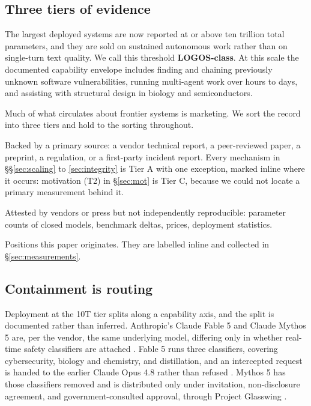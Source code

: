 \documentclass[11pt]{article}
\begin{document}
\subsection{Three tiers of evidence}

The largest deployed systems are now reported at or above ten trillion total parameters, and they are sold on sustained autonomous work rather than on single-turn text quality. We call this threshold \textbf{LOGOS-class}. At this scale the documented capability envelope includes finding and chaining previously unknown software vulnerabilities, running multi-agent work over hours to days, and assisting with structural design in biology and semiconductors.

Much of what circulates about frontier systems is marketing. We sort the record into three tiers and hold to the sorting throughout.

\begin{description}[itemsep=3pt,leftmargin=1.4em]
\item[Tier A, documented.] Backed by a primary source: a vendor technical report, a peer-reviewed paper, a preprint, a regulation, or a first-party incident report. Every mechanism in \S\S\ref{sec:scaling} to \ref{sec:integrity} is Tier A with one exception, marked inline where it occurs: motivation (T2) in \S\ref{sec:mot} is Tier C, because we could not locate a primary measurement behind it.
\item[Tier B, reported.] Attested by vendors or press but not independently reproducible: parameter counts of closed models, benchmark deltas, prices, deployment statistics.
\item[Tier C, ours.] Positions this paper originates. They are labelled inline and collected in \S\ref{sec:measurements}.
\end{description}

\subsection{Containment is routing}

Deployment at the 10T tier splits along a capability axis, and the split is documented rather than inferred. Anthropic's Claude Fable 5 and Claude Mythos 5 are, per the vendor, the same underlying model, differing only in whether real-time safety classifiers are attached \cite{anthropic2026fablemythos}. Fable 5 runs three classifiers, covering cybersecurity, biology and chemistry, and distillation, and an intercepted request is handed to the earlier Claude Opus 4.8 rather than refused \cite{anthropic2026fablemythos,anthropic2026redeploy}. Mythos 5 has those classifiers removed and is distributed only under invitation, non-disclosure agreement, and government-consulted approval, through Project Glasswing \cite{anthropic2026glasswing}.
\end{document}

